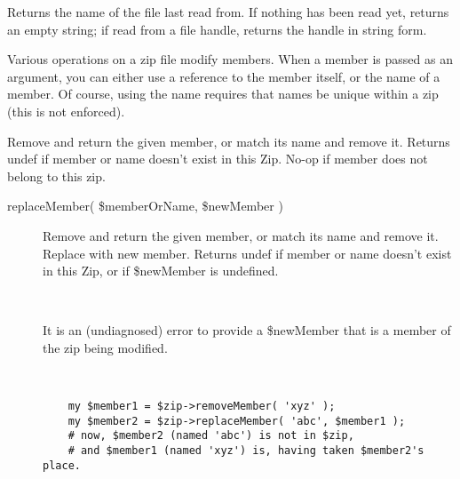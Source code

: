 \documentclass[]{article}
\renewcommand{\emph}[1]{\underline{#1}}
\begin{document}
\begin{description}
\itemsep1pt\parskip0pt
\item[\emph{fileName()}]
Returns the name of the file last read from. If nothing has been read
yet, returns an empty string; if read from a file handle, returns the
handle in string form.
\end{description}


Various operations on a zip file modify members. When a member is passed
as an argument, you can either use a reference to the member itself, or
the name of a member. Of course, using the name requires that names be
unique within a zip (this is not enforced).

\begin{description}
\itemsep1pt\parskip0pt
\item[removeMember( \$memberOrName )]
Remove and return the given member, or match its name and remove it.
Returns undef if member or name doesn't exist in this Zip. No-op if
member does not belong to this zip.
\end{description}

\begin{description}
\item[replaceMember( \$memberOrName, \$newMember )]
Remove and return the given member, or match its name and remove it.
Replace with new member. Returns undef if member or name doesn't exist
in this Zip, or if \$newMember is undefined.

~

It is an (undiagnosed) error to provide a \$newMember that is a member
of the zip being modified.

~

\begin{verbatim}
    my $member1 = $zip->removeMember( 'xyz' );
    my $member2 = $zip->replaceMember( 'abc', $member1 );
    # now, $member2 (named 'abc') is not in $zip,
    # and $member1 (named 'xyz') is, having taken $member2's place.
    
\end{verbatim}
\end{description}
\end{document}

